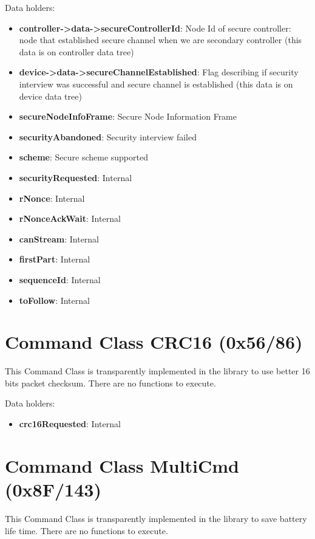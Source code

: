 \noindent
Data holders:

\begin{itemize}
\item \textbf{controller->data->secureControllerId}: Node Id of secure controller: node that established secure channel when we are secondary controller (this data is on controller data tree)
\item \textbf{device->data->secureChannelEstablished}: Flag describing if security interview was successful and secure channel is established (this data is on device data tree)
\item \textbf{secureNodeInfoFrame}: Secure Node Information Frame
\item \textbf{securityAbandoned}: Security interview failed
\item \textbf{scheme}: Secure scheme supported
\item \textbf{securityRequested}: Internal
\item \textbf{rNonce}: Internal
\item \textbf{rNonceAckWait}: Internal
\item \textbf{canStream}: Internal
\item \textbf{firstPart}: Internal
\item \textbf{sequenceId}: Internal
\item \textbf{toFollow}: Internal
\end{itemize}


\section{Command Class CRC16 (0x56/86)}

This Command Class is transparently implemented in the library to use better 16 bits packet checksum. There are no functions to execute.
\newline

\noindent
Data holders:

\begin{itemize}
\item \textbf{crc16Requested}: Internal
\end{itemize}


\section{Command Class MultiCmd (0x8F/143)}

This Command Class is transparently implemented in the library to save battery life time. There are no functions to execute.
\newline

